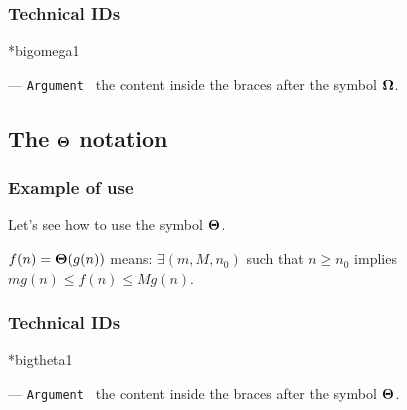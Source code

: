 \documentclass[12pt,a4paper]{article}
\makeatletter
\theoremstyle{definition}
\newcommand\IDmacro{\@ifstar{\@IDmacroStar}{\@IDmacroNoStar}}
\newcommand\@IDmacroNoStar[3]{%
        \texttt{%
        	\textbackslash#1%
        	\IfStrEq{#2}{0}{}{%
        		\,\,[#2 Option%
				\IfStrEq{#2}{1}{}{s}]%
			}%
    	    \,\,(#3 Argument%
				\IfStrEq{#3}{1}{}{s})%
	   	}
        \immediate\write\tempfile{macro@#1@#2@#3}%
    }
\newcommand\@IDmacroStar[2]{%
        \@IDmacroNoStar{#1}{0}{#2}%
    }
\newcommand\@IDoptarg[2]{%
    	\vspace{0.5em}
		--- \texttt{#1%
			\IfStrEq{#2}{}{:}{\,\##2:}%
		}%
	}
\newcommand\IDarg[1]{%
    	\@IDoptarg{Argument}{#1}%
	}
\newcommand\@bigtAsymptoricOpe[2]{%
        \ensuremath{%
            \if\relax\detokenize{#2}\relax
                #1%
            \else
                \mathop{}\mathopen{}#1\mathopen{}\left( #2 \right)%
            \fi
        }%
    }
\newcommand\bigomega[1]{%
        \@bigtAsymptoricOpe{\bm{\Omega}}{#1}%
    }
\newcommand\bigtheta[1]{%
        \@bigtAsymptoricOpe{\bm{\Theta}}{#1}%
    }
\makeatother
\begin{document}
        \subsubsection{Technical IDs}

\IDmacro*{bigomega}{1}

\IDarg{} the content inside the braces after the symbol $\bigomega{}$.



    \subsection{\texorpdfstring{The $\bigtheta{}$ notation}%
                               {The "big Theta" notation}}

        \subsubsection{Example of use}

\begin{tcblisting}{}
Let's see how to use the symbol $\bigtheta{}$.

\medskip

$f(n) = \bigtheta{g(n)}$ means: $\exists (m, M, n_0)$ such that
$n \geqslant n_0$ implies $m g(n) \leqslant f(n) \leqslant M g(n)$.
\end{tcblisting}


        \subsubsection{Technical IDs}

\IDmacro*{bigtheta}{1}

\IDarg{} the content inside the braces after the symbol $\bigtheta{}$.
\end{document}
